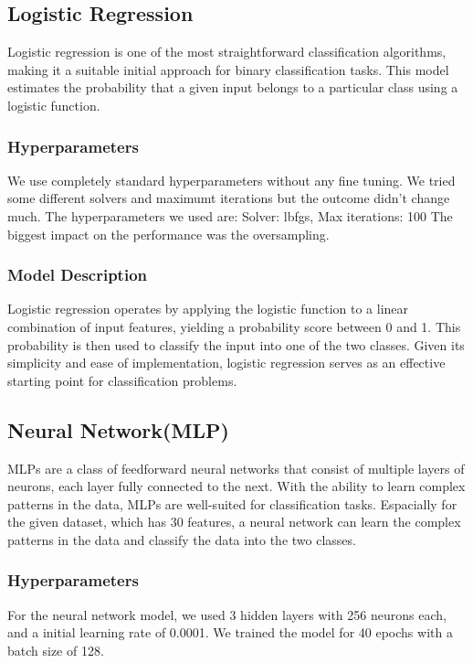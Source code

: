 \documentclass[a4, 10 pt, conference]{ieeeconf}  %
\begin{document}
\subsection{Logistic Regression}
Logistic regression is one of the most straightforward classification algorithms, making it a suitable initial approach for binary classification tasks.
This model estimates the probability that a given input belongs to a particular class using a logistic function.

\subsubsection{Hyperparameters}
We use completely standard hyperparameters without any fine tuning.
We tried some different solvers and maximumt iterations but the outcome didn't change much.
The hyperparameters we used are:
Solver: lbfgs, Max iterations: 100
The biggest impact on the performance was the oversampling.

\subsubsection{Model Description}
Logistic regression operates by applying the logistic function to a linear combination of input features, yielding a probability score between 0 and 1.
This probability is then used to classify the input into one of the two classes. Given its simplicity and ease of implementation, logistic regression serves
as an effective starting point for classification problems.

\subsection{Neural Network(MLP)}
MLPs are a class of feedforward neural networks that consist of multiple layers of neurons, each layer fully connected to the next. With the ability to learn complex patterns
in the data, MLPs are well-suited for classification tasks. Espacially for the given dataset, which has 30 features, a neural network can learn the complex patterns in the data and classify the data into the two classes.

\subsubsection{Hyperparameters}
For the neural network model, we used 3 hidden layers with 256 neurons each, and a initial learning rate of 0.0001. We trained the model for 40 epochs with a batch size of 128.
\end{document}
